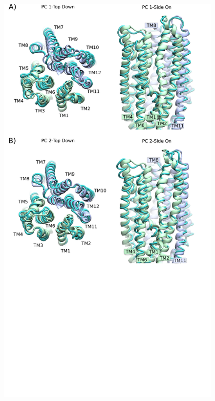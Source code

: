 \begin{figure}
	\begin{center}
		\includegraphics[width=1\textwidth]{figures/opening/pca_motions.pdf}
	\end{center}
	\captionsetup{singlelinecheck = false, justification=raggedright}

\end{figure}
